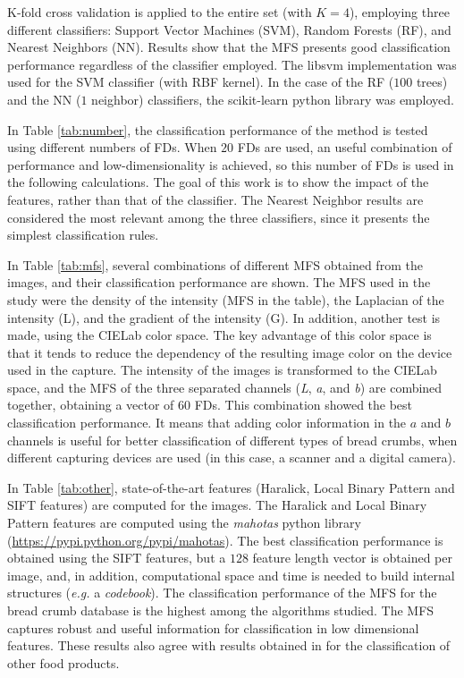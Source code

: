 \documentclass[a4paper,10pt]{article}
\begin{document}
K-fold cross validation is applied to the entire set (with $K=4$), employing three different classifiers: Support Vector Machines (SVM), Random Forests (RF), and Nearest Neighbors (NN). Results show that the MFS presents good classification performance regardless of the classifier employed. The \textsf{libsvm} implementation \cite{Chang2011} was used for the SVM classifier (with RBF kernel). In the case of the RF ($100$ trees) and the NN ($1$ neighbor) classifiers, the \textsf{scikit-learn} python library was employed.

In Table \ref{tab:number}, the classification performance of the method is tested using different numbers of FDs. When $20$ FDs are used, an useful combination of performance and low-dimensionality is achieved, so this number of FDs is used in the following calculations. The goal of this work is to show the impact of the features, rather than that of the classifier. The Nearest Neighbor results are considered the most relevant among the three classifiers, since it presents the simplest classification rules.

In Table \ref{tab:mfs}, several combinations of different MFS obtained from the images, and their classification performance are shown. The MFS used in the study were the density of the intensity (MFS in the table), the Laplacian of the intensity (L), and the gradient of the intensity (G). In addition, another test is made, using the CIELab color space. The key advantage of this color space is that it tends to reduce the dependency of the resulting image color on the device used in the capture. The intensity of the images is transformed to the CIELab space, and the MFS of the three separated channels ({\em L}, {\em a}, and {\em b}) are combined together, obtaining a vector of $60$ FDs. This combination showed the best classification performance. It means that adding color information in the $a$ and $b$ channels is useful for better classification of different types of bread crumbs, when different capturing devices are used (in this case, a scanner and a digital camera).

In Table \ref{tab:other}, state-of-the-art features (Haralick, Local Binary Pattern and SIFT features) are computed for the images. The Haralick and Local Binary Pattern features are computed using the {\em mahotas} python library (\url{https://pypi.python.org/pypi/mahotas}). The best classification performance is obtained using the SIFT features, but a $128$ feature length vector is obtained per image, and, in addition, computational space and time is needed to build internal structures ({\em e.g.} a {\em codebook}). The classification performance of the MFS for the bread crumb database is the highest among the algorithms studied. The MFS captures robust and useful information for classification in low dimensional features. These results also agree with results obtained in \cite{Bosch2011} for the classification of other food products.
\end{document}
